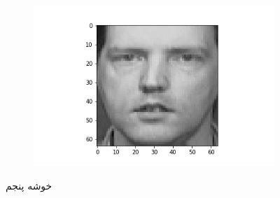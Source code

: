 \documentclass[12pt, a4paper]{article}
\begin{document}
\begin{figure}[h]
\begin{subfigure}{0.3\linewidth}
    \end{subfigure}
    \newline
    \hfill
    \begin{subfigure}{0.3\linewidth}
        \centering
        \includegraphics[width=\linewidth]{images/q3/c/4/9.png}
    \end{subfigure}
    \caption{خوشه پنجم}
\end{figure}

\clearpage
\end{document}
